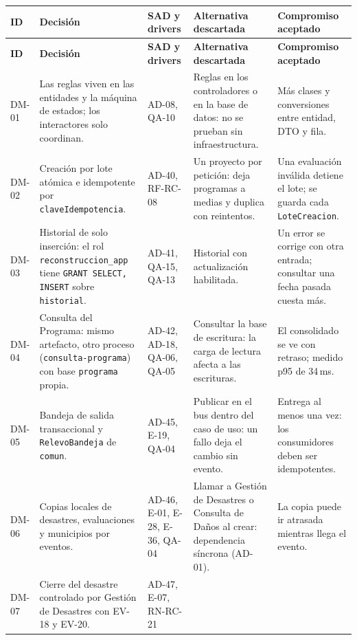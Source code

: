 \documentclass[11pt,a4paper]{article}
\begin{document}
{\small
\begin{longtable}{|P{1.1cm}|P{3.6cm}|P{2.4cm}|P{3.4cm}|P{3.6cm}|}
  \hline
  \textbf{ID} & \textbf{Decisión} & \textbf{SAD y drivers} & \textbf{Alternativa descartada}
  & \textbf{Compromiso aceptado} \\ \hline
  \endfirsthead
  \hline
  \textbf{ID} & \textbf{Decisión} & \textbf{SAD y drivers} & \textbf{Alternativa descartada}
  & \textbf{Compromiso aceptado} \\ \hline
  \endhead
  DM-01 & Las reglas viven en las entidades y la máquina de estados; los interactores solo coordinan. & AD-08, QA-10
    & Reglas en los controladores o en la base de datos: no se prueban sin infraestructura.
    & Más clases y conversiones entre entidad, DTO y fila. \\ \hline
  DM-02 & Creación por lote atómica e idempotente por \texttt{claveIdempotencia}. & AD-40, RF-RC-08
    & Un proyecto por petición: deja programas a medias y duplica con reintentos.
    & Una evaluación inválida detiene el lote; se guarda cada \texttt{LoteCreacion}. \\ \hline
  DM-03 & Historial de solo inserción: el rol \texttt{reconstruccion\_app} tiene \texttt{GRANT SELECT, INSERT} sobre
    \texttt{historial}. & AD-41, QA-15, QA-13
    & Historial con actualización habilitada.
    & Un error se corrige con otra entrada; consultar una fecha pasada cuesta más. \\ \hline
  DM-04 & Consulta del Programa: mismo artefacto, otro proceso (\texttt{consulta-programa}) con base
    \texttt{programa} propia. & AD-42, AD-18, QA-06, QA-05
    & Consultar la base de escritura: la carga de lectura afecta a las escrituras.
    & El consolidado se ve con retraso; medido p95 de 34\,ms. \\ \hline
  DM-05 & Bandeja de salida transaccional y \texttt{RelevoBandeja} de \texttt{comun}. & AD-45, E-19, QA-04
    & Publicar en el bus dentro del caso de uso: un fallo deja el cambio sin evento.
    & Entrega al menos una vez: los consumidores deben ser idempotentes. \\ \hline
  DM-06 & Copias locales de desastres, evaluaciones y municipios por eventos. & AD-46, E-01, E-28, E-36, QA-04
    & Llamar a Gestión de Desastres o Consulta de Daños al crear: dependencia síncrona (AD-01).
    & La copia puede ir atrasada mientras llega el evento. \\ \hline
  DM-07 & Cierre del desastre controlado por Gestión de Desastres con EV-18 y EV-20. & AD-47, E-07, RN-RC-21

\end{longtable}}
\end{document}
